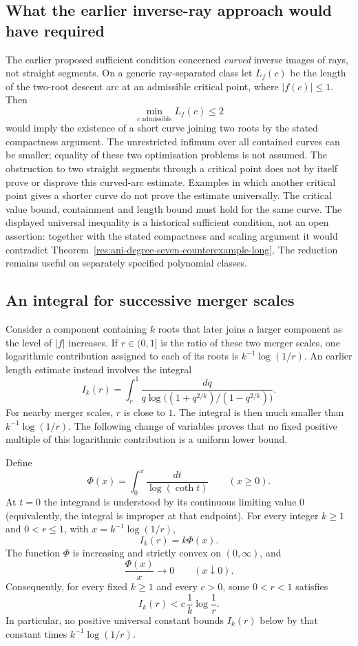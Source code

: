\subsection*{What the earlier inverse-ray approach would have required}

The earlier proposed sufficient condition concerned \emph{curved}
inverse images of rays, not straight segments.  On a generic ray-separated class let $L_f(c)$ be
the length of the two-root descent arc at an admissible critical point,
where $|f(c)|\le1$.  Then
\[
 \min_{c\ \mathrm{admissible}}L_f(c)\le2
\]
would imply the existence of a short curve joining two roots by the stated compactness
argument.  The unrestricted infimum over all contained curves can be
smaller; equality of these two optimisation problems is not assumed.
The obstruction to two straight segments through a critical point does
not by itself prove or disprove this curved-arc estimate.  Examples in which another critical point gives a shorter curve do not
prove the estimate universally. The critical value bound, containment and
length bound must hold for the same curve. The displayed universal
inequality is a historical sufficient condition, not an open assertion:
together with the stated compactness and scaling argument it would
contradict Theorem~\ref{res:ani-degree-seven-counterexample-long}.
The reduction remains useful on separately specified polynomial classes.

\subsection*{An integral for successive merger scales}\label{subsec:merger-integral}
Consider a component containing $k$ roots that later joins a larger
component as the level of $|f|$ increases. If $r\in(0,1]$ is the ratio
of these two merger scales, one logarithmic contribution assigned to each
of its roots is $k^{-1}\log(1/r)$. An earlier length estimate instead
involves the integral
\[
 I_k(r)=\int_r^1
 \frac{dq}{q\log\bigl((1+q^{2/k})/(1-q^{2/k})\bigr)}.
\]
For nearby merger scales, $r$ is close to $1$. The integral is then much
smaller than $k^{-1}\log(1/r)$. The following change of variables proves
that no fixed positive multiple of this logarithmic contribution is a
uniform lower bound.

\begin{theorem}
\label{res:orlicz-currency}
Define
\[
 \Phi(x)=\int_0^x\frac{dt}{\log(\coth t)}\qquad(x\ge0).
\]
At $t=0$ the integrand is understood by its continuous limiting value $0$
(equivalently, the integral is improper at that endpoint).
For every integer $k\ge1$ and $0<r\le1$, with
$x=k^{-1}\log(1/r)$,
\[
 I_k(r)=k\Phi(x).                                      \tag{O1}
\]
The function $\Phi$ is increasing and strictly convex on $(0,\infty)$, and
\[
 \frac{\Phi(x)}x\longrightarrow0\qquad(x\downarrow0). \tag{O2}
\]
Consequently, for every fixed $k\ge1$ and every $c>0$, some $0<r<1$
satisfies
\[
 I_k(r)<c\,\frac1k\log\frac1r.                        \tag{O3}
\]
In particular, no positive universal constant bounds $I_k(r)$ below
by that constant times $k^{-1}\log(1/r)$.
\end{theorem}

